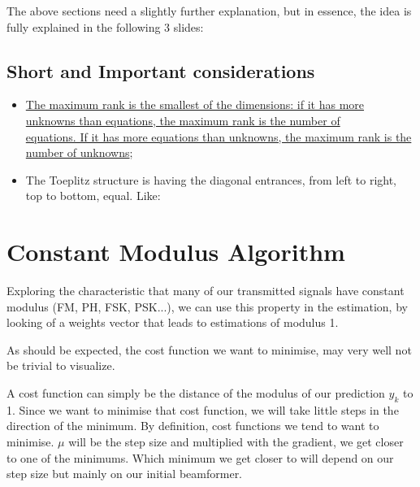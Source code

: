 \documentclass[12pt, a4paper]{article}
\begin{document}
The above sections need a slightly further explanation, but in essence, the idea is fully explained in the following 3 slides:





\subsection{Short and Important considerations}

\begin{itemize}
    \item \uline{The maximum rank is the smallest of the dimensions: if it has more unknowns than equations, the maximum rank is the number of\\ equations. If it has more equations than unknowns, the maximum rank is the number of unknowns};
    \item The Toeplitz structure is having the diagonal entrances, from left to right, top to bottom, equal. Like:
\end{itemize}

\section{Constant Modulus Algorithm}
Exploring the characteristic that many of our transmitted signals have constant modulus (FM, PH, FSK, PSK...), we can use this property in the estimation, by looking of a weights vector that leads to estimations of modulus 1. 



As should be expected, the cost function we want to minimise, may very well not be trivial to visualize.


A cost function can simply be the distance of the modulus of our prediction $y_k$ to 1. Since we want to minimise that cost function, we will take little steps in the direction of the minimum. By definition, cost functions we tend to want to minimise. $\mu$ will be the step size and multiplied with the gradient, we get closer to one of the minimums. Which minimum we get closer to will depend on our step size but mainly on our initial beamformer. 
\end{document}
